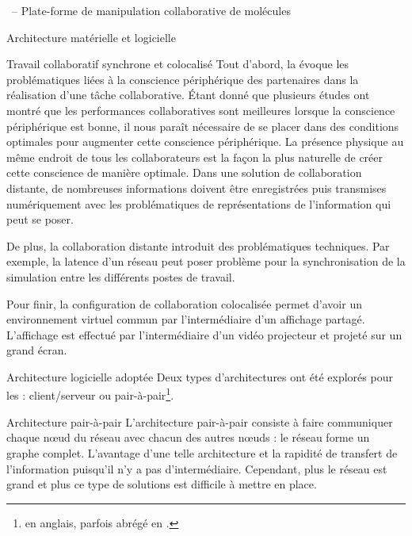 \documentclass[myfrancais,ngerman,english,frenchb]{mythesis}
\begin{document}
\begin{mychapter}{\myShaddock\ -- Plate-forme de manipulation collaborative de molécules}
\begin{mysection}{Architecture matérielle et logicielle}
\begin{mysubsection}{Travail collaboratif synchrone et colocalisé}
				Tout d'abord, la  évoque les problématiques liées à la conscience périphérique des partenaires dans la réalisation d'une tâche collaborative.
				Étant donné que plusieurs études ont montré que les performances collaboratives sont meilleures lorsque la conscience périphérique est bonne, il nous paraît nécessaire de se placer dans des conditions optimales pour augmenter cette conscience périphérique.
				La présence physique au même endroit de tous les collaborateurs est la façon la plus naturelle de créer cette conscience de manière optimale.
				Dans une solution de collaboration distante, de nombreuses informations doivent être enregistrées puis transmises numériquement avec les problématiques de représentations de l'information qui peut se poser.

				De plus, la collaboration distante introduit des problématiques techniques.
				Par exemple, la latence d'un réseau peut poser problème pour la synchronisation de la simulation entre les différents postes de travail.

				Pour finir, la configuration de collaboration colocalisée permet d'avoir un environnement virtuel commun par l'intermédiaire d'un affichage partagé.
				L'affichage est effectué par l'intermédiaire d'un vidéo projecteur et projeté sur un grand écran.
			\end{mysubsection}
			\begin{mysubsection}{Architecture logicielle adoptée}
				Deux types d'architectures ont été explorés pour les  : client/serveur ou pair-à-pair\footnote{ en anglais, parfois abrégé en \myPtwoP.}.
				\begin{mysubsubsection}{Architecture pair-à-pair}
					L'architecture pair-à-pair consiste à faire communiquer chaque nœud du réseau avec chacun des autres nœuds : le réseau forme un graphe complet.
					L'avantage d'une telle architecture et la rapidité de transfert de l'information puisqu'il n'y a pas d'intermédiaire.
					Cependant, plus le réseau est grand et plus ce type de solutions est difficile à mettre en place.


\end{mysubsubsection}
\end{mysubsection}
\end{mysection}
\end{mychapter}
\end{document}
